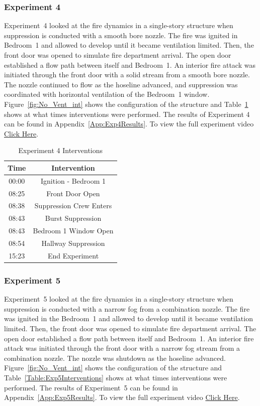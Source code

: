 \documentclass[12pt,oneside]{book}
\begin{document}
\FloatBarrier

\subsubsection{Experiment 4}
Experiment~4 looked at the fire dynamics in a single-story structure when suppression is conducted with a smooth bore nozzle. The fire was ignited in Bedroom~1 and allowed to develop until it became ventilation limited. Then, the front door was opened to simulate fire department arrival. The open door established a flow path between itself and Bedroom~1. An interior fire attack was initiated through the front door with a solid stream from a smooth bore nozzle. The nozzle continued to flow as the hoseline advanced, and suppression was coordinated with horizontal ventilation of the Bedroom~1 window. Figure~\ref{fig:No_Vent_int} shows the configuration of the structure and Table~\ref{Table:Exp4Interventions} shows at what times interventions were performed. The results of Experiment 4 can be found in Appendix~\ref{App:Exp4Results}. To view the full experiment video \href{https://player.vimeo.com/video/170499609?autoplay=1}{Click Here}.

\begin{table}[!ht]
	\centering
	\caption{Experiment 4 Interventions}
	\begin{tabular}{|c|c|} 
		\hline
		Time & Intervention \\ \hline \hline
		00:00 & Ignition - Bedroom 1 \\ \hline
		08:25 & Front Door Open \\ \hline
		08:38 & Suppression Crew Enters\\ \hline
		08:43 & Burst Suppression \\ \hline
		08:43 & Bedroom 1 Window Open \\ \hline 
		08:54 & Hallway Suppression \\ \hline
		15:23 & End Experiment\\ \hline
	\end{tabular}
	\label{Table:Exp4Interventions}
\end{table}

\FloatBarrier

\subsubsection{Experiment 5}
Experiment~5 looked at the fire dynamics in a single-story structure when suppression is conducted with a narrow fog from a combination nozzle. The fire was ignited in the Bedroom~1 and allowed to develop until it became ventilation limited. Then, the front door was opened to simulate fire department arrival. The open door established a flow path between itself and Bedroom~1. An interior fire attack was initiated through the front door with a narrow fog stream from a combination nozzle. The nozzle was shutdown as the hoseline advanced. Figure~\ref{fig:No_Vent_int} shows the configuration of the structure and Table~\ref{Table:Exp5Interventions} shows at what times interventions were performed. The results of Experiment~5 can be found in Appendix~\ref{App:Exp5Results}. To view the full experiment video \href{https://player.vimeo.com/video/170511425?autoplay=1}{Click Here}.
\end{document}

